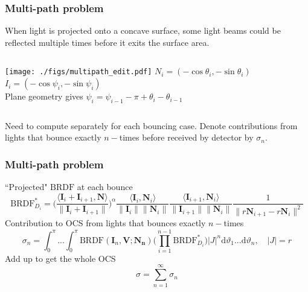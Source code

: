 \documentclass{beamer}
\newcommand{\BRDF}{\mathrm{BRDF}}
\newcommand{\ip}[2]{\langle {#1}, {#2} \rangle}
\begin{document}
\begin{frame}[t]
\frametitle{Multi-path problem}
When light is projected onto a concave surface, some light beams could be reflected multiple times before it exits the surface area. 
\begin{columns}
 \texttt{[image: ./figs/multipath\_edit.pdf]}
 $N_i=(-\cos \theta_i,-\sin\theta_i)$\\ $I_i=(-\cos \psi_i,-\sin\psi_i)$\\ Plane geometry gives $\psi_{i}=\psi_{i-1}-\pi+\theta_i-\theta_{i-1}$
\end{columns}
Need to compute separately for each bouncing case. Denote contributions from lights that bounce exactly $n-$times before received by detector by $\sigma_n$.
\end{frame}

\begin{frame}[t]
\frametitle{Multi-path problem}
``Projected" $\BRDF$ at each bounce
$$\BRDF^*_{D_i}=\Bigg(\frac{\ip{\mathbf{I}_i+\mathbf{I}_{i+1}}{\mathbf{N}}}{\|\mathbf{I}_i+\mathbf{I}_{i+1}\|}\Bigg)^\alpha\frac{\ip{\mathbf{I}_i}{\mathbf{N}_i}}{\|\mathbf{I}_i\|\|\mathbf{N}_i\|}\frac{\ip{\mathbf{I}_{i+1}}{\mathbf{N}_i}}{\|\mathbf{I}_{i+1}\|\|\mathbf{N}_i\|} \frac{1}{\|r\mathbf{N}_{i+1}-r\mathbf{N}_i\|^2}$$
Contribution to OCS from lights that bounces exactly $n-$times 
\begin{equation*}
\sigma_n =\int_{0}^{\pi}...\int_{0}^{\pi}\BRDF(\mathbf{I}_n,\mathbf{V};\mathbf{N_n})\bigg(\prod_{i=1}^{n-1}\BRDF^*_{D_i}\bigg) |J|^n\mathrm{d}\vartheta_1...\mathrm{d}\vartheta_n , \quad |J|=r
\end{equation*}
Add up to get the whole OCS
$$\sigma=\sum_{n=1}^{\infty} \sigma_n$$
\end{frame}
\end{document}
